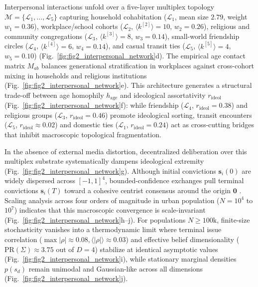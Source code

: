 \documentclass[11pt,a4paper]{article}
\begin{document}
Interpersonal interactions unfold over a five-layer multiplex topology $\mathcal{M} = \{\mathcal{L}_1, \dots, \mathcal{L}_5\}$ \citep{boccaletti2014structure, kivela2014multilayer} capturing household cohabitation ($\mathcal{L}_1$, mean size $2.79$, weight $w_1 = 0.36$), workplace/school cohorts ($\mathcal{L}_2$, $\langle k^{[2]} \rangle = 10$, $w_2 = 0.26$), religious and community congregations ($\mathcal{L}_3$, $\langle k^{[3]} \rangle = 8$, $w_3 = 0.14$), small-world friendship circles ($\mathcal{L}_4$, $\langle k^{[4]} \rangle = 6$, $w_4 = 0.14$), and casual transit ties ($\mathcal{L}_5$, $\langle k^{[5]} \rangle = 4$, $w_5 = 0.10$) (Fig.~\ref{fig:fig2_interpersonal_network}d). The empirical age contact matrix $M_{ab}$ balances generational stratification in workplaces against cross-cohort mixing in households and religious institutions (Fig.~\ref{fig:fig2_interpersonal_network}e). This architecture generates a structural trade-off between age homophily $h_{\mathrm{age}}$ and ideological assortativity $r_{\mathrm{ideol}}$ (Fig.~\ref{fig:fig2_interpersonal_network}f): while friendship ($\mathcal{L}_4$, $r_{\mathrm{ideol}} = 0.38$) and religious groups ($\mathcal{L}_3$, $r_{\mathrm{ideol}} = 0.46$) promote ideological sorting, transit encounters ($\mathcal{L}_5$, $r_{\mathrm{ideol}} \approx 0.02$) and domestic ties ($\mathcal{L}_1$, $r_{\mathrm{ideol}} = 0.24$) act as cross-cutting bridges that inhibit macroscopic topological fragmentation.

In the absence of external media distortion, decentralized deliberation over this multiplex substrate systematically dampens ideological extremity (Fig.~\ref{fig:fig2_interpersonal_network}g). Although initial convictions $\mathbf{s}_i(0)$ are widely dispersed across $[-1, 1]^4$, bounded-confidence exchanges pull terminal convictions $\mathbf{s}_i(T)$ toward a cohesive centrist consensus around the origin $\mathbf{0}$ \citep{castellano2009statistical}. Scaling analysis across four orders of magnitude in urban population ($N = 10^4$ to $10^7$) indicates that this macroscopic convergence is scale-invariant (Fig.~\ref{fig:fig2_interpersonal_network}h--j). For populations $N \ge 100\mathrm{k}$, finite-size stochasticity vanishes into a thermodynamic limit where terminal issue correlation ($\max |\rho| \approx 0.08, \langle |\rho| \rangle \approx 0.03$) and effective belief dimensionality ($\mathrm{PR}(\Sigma) \approx 3.75$ out of $D=4$) stabilize at identical asymptotic values (Fig.~\ref{fig:fig2_interpersonal_network}i), while stationary marginal densities $p(s_d)$ remain unimodal and Gaussian-like across all dimensions (Fig.~\ref{fig:fig2_interpersonal_network}j).
\end{document}
